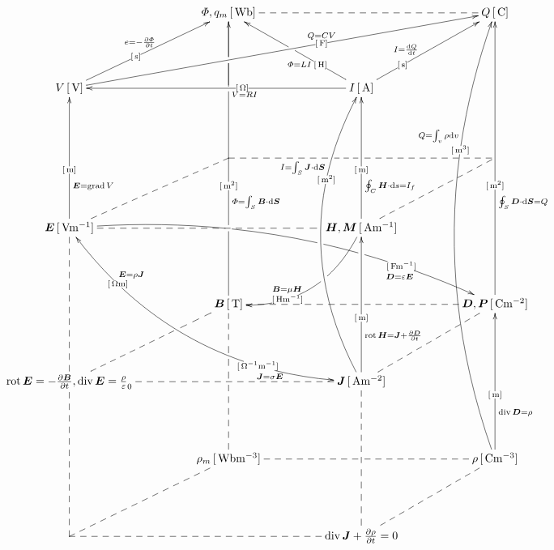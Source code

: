 \documentclass[a4j,10pt]{jarticle}
\makeatletter
\def\uni#1{[\unit{#1}]}
\def\cell#1#2{#1\,\uni{#2}}
\def\dottedhole#1{\ar@{--}[#1]|!{[ld];[lu]}\hole}
\def\dottedholea#1{\ar@{--}[#1]|!{[ld];[lu]}\hole |!{+(-9.5,-10);+(-9.5,10)}\hole }
\def\dotted#1{\ar@{--}[#1]}
\def\dotteda#1{\ar@{--}[#1] |!{+(11.5,-50);+(11.5,50)}\hole}
\def\arrow#1#2#3{\ar[#1]|-(.4){\uni{#2}}_(.3){#3}}
\def\arrowq#1#2#3{\ar[#1]|-(.4){\uni{#2}}_(.35){#3}}
\def\arroww#1#2#3{\ar[#1]|-(.25){\uni{#2}}^(.4){#3}|!{[ll];[ru]}\hole}
\def\arrowu#1#2#3{\ar[#1]|-(.4){\uni{#2}}^(.4){#3}}
\def\arrowuu#1#2#3{\ar[#1]|-(.4){\uni{#2}}^(.5){#3}}
\def\arrowx#1#2#3{\ar[#1]|-(.6){\uni{#2}}^(.6){#3}}
\def\arrowy#1#2#3{\ar@/^3pc/[#1]|-(.7){\uni{#2}}^(.72){#3}}
\def\arrowyy#1#2#3#4#5{\ar@/_3pc/@{<->}[#1]|-(0.2){\uni{#4}}^(0.2){#5}|-(.75){\uni{#2}}_(.75){#3}}
\def\arrowz#1#2#3{\ar@/^2pc/[#1] |!{+(-10,-10);+(-10,10)}\hole|-(.7){\uni{#2}}_(.6){#3}}
\def\arrowzz#1#2#3{\ar@/^2.2pc/[#1] |!{[ru];[rd]}\hole |!{+(39,-10);+(39,10)}\hole |!{[rr];[rrdd]}\hole |-(.8){\uni{#2}}_(.8){#3\quad}}
\def\arrowp#1#2#3{\ar@{->}[#1] _(.35){#3} |!{[u];[u]}\hole |-(0.4){\uni{#2}} |!{[uuu];[uuu]}\hole |!{[luuu];[ruuuru]}\hole} %
\def\B{\bm B}
\def\D{\bm D}
\def\E{\bm E}
\def\H{\bm H}
\def\J{\bm J}
\def\S{\bm S}
\def\P{\bm P}
\def\M{\bm M}
\makeatother
\begin{document}
\[\xymatrix@=0.70in{
 & \cell{\varPhi, q_m}{Wb}\dotted{rr}\ar @{-}[d]|!{[ld];[rr]}\hole     &        & \cell{Q}{C}\\
 \cell V V\arrowuu{ur}{s}{e=-\fracpd\varPhi t}\arrowx{rrru}{F}{Q=CV}      &          & \cell I A\arrowu{ll}{O}{V=RI}\arroww{ur}{s}{I=\diff Q t}\arroww{lu}{H}{\varPhi=LI}        & \\
 & *=0{}         & *=0{}       & \dottedholea{ll}\dotted{ld}\\
 \cell{\E}{Vm^{-1}}\arrow{uu}{m}{\E=\grad V}\dotted{rr} |!{+(20,-10);+(20,10)}\hole |!{+(32.5,-10);+(32.5,10)}\hole \dotted{ru}\arrowzz{rrrd}{Fm^{-1}}{\D=\varepsilon\E}\arrowyy{rrdd}{O^{-1}m^{-1}}{\J=\sigma\E}{Om}{\E=\rho\J } &          & \cell{\H,\M}{Am^{-1}}\arrow{uu}{m}{\oint_C\H\cdot\dd s=I_f}\arrowz{dl}{Hm^{-1}}{\B=\mu\H}       & \\
 & \cell{\B}{T}\arrowp{uuuu}{m^2}{\varPhi=\int_S\B\cdot\dd\S} &        & \cell{\D,\P}{Cm^{-2}}\arrowq{uuuu}{m^2}{\oint_S\D\cdot\dd\bm{S}=Q}\dottedhole{ll}\dotted{ld}\\
 {{\rot\E=-\frac{\partial\B}{\partial t}} ,{\diver\E=\frac\rho\varepsilon_0}}\dotted{uu}\dotted{rr}\dotteda{ru}     &          & \cell{\J}{Am^{-2}}\arrow{uu}{m}{\rot\H=\J +\frac{\partial\D}{\partial t}}\arrowy{uuuu}{m^2}{I=\int_S\J\cdot\dd\S}\\
 & \cell{\rho_m}{Wbm^{-3}}\ar@{--}[uu]|!{[u];[u]}\hole |!{[u]+(-10,12);[u]+(10,12)}\hole      &        & \cell{\rho}{Cm^{-3}}\arrow{uu}{m}{\diver\D=\rho}\arrowy{uuuuuu}{m^3}{Q=\int_v\rho\dd v}\dottedhole{ll}\dotted{ld}\\
 *=0{} \dotted{uu}\dotted{rr}\dotted{ru}           &          & \diver\J +\frac{\partial\rho}{\partial t}=0\dotted{uu} |!{+(-10,-10);(10,-10)}\hole      & \\
}\]
\end{document}
